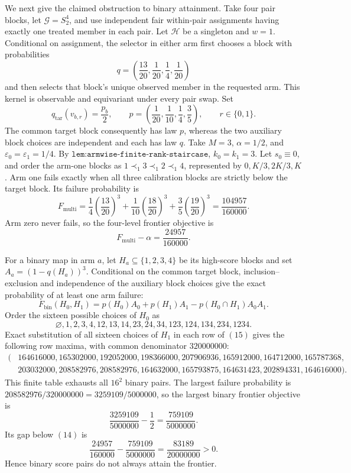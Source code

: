 We next give the claimed obstruction to binary attainment. Take four pair blocks, let \(\mathcal G=S_2^4\), and use independent fair within-pair assignments having exactly one treated member in each pair. Let \(\mathcal H\) be a singleton and \(w=1\). Conditional on assignment, the selector in either arm first chooses a block with probabilities
\[
q=\left(\frac{13}{20},\frac1{20},\frac14,\frac1{20}\right)
\tag{11}
\]
and then selects that block's unique observed member in the requested arm. This kernel is observable and equivariant under every pair swap. Set
\[
q_{\mathrm{tar}}(v_{b,r})=\frac{p_b}{2},
\qquad
p=\left(\frac1{20},\frac1{10},\frac14,\frac35\right),
\qquad r\in\{0,1\}.
\tag{12}
\]
The common target block consequently has law \(p\), whereas the two auxiliary block choices are independent and each has law \(q\). Take \(M=3\), \(\alpha=1/2\), and \(\varepsilon_0=\varepsilon_1=1/4\). By \(\texttt{lem:armwise-finite-rank-staircase}\), \(k_0=k_1=3\). Let \(s_0\equiv0\), and order the arm-one blocks as \(1\prec_1 3\prec_1 2\prec_1 4\), represented by \(0,K/3,2K/3,K\). Arm one fails exactly when all three calibration blocks are strictly below the target block. Its failure probability is
\[
F_{\mathrm{multi}}
=\frac14\left(\frac{13}{20}\right)^3
+\frac1{10}\left(\frac{18}{20}\right)^3
+\frac35\left(\frac{19}{20}\right)^3
=\frac{104957}{160000}.
\tag{13}
\]
Arm zero never fails, so the four-level frontier objective is
\[
F_{\mathrm{multi}}-\alpha=\frac{24957}{160000}.
\tag{14}
\]

For a binary map in arm \(a\), let \(H_a\subseteq\{1,2,3,4\}\) be its high-score blocks and set \(A_a=(1-q(H_a))^3\). Conditional on the common target block, inclusion--exclusion and independence of the auxiliary block choices give the exact probability of at least one arm failure:
\[
F_{\mathrm{bin}}(H_0,H_1)
=p(H_0)A_0+p(H_1)A_1-p(H_0\cap H_1)A_0A_1.
\tag{15}
\]
Order the sixteen possible choices of \(H_0\) as
\[
\varnothing,1,2,3,4,12,13,14,23,24,34,123,124,134,234,1234.
\]
Exact substitution of all sixteen choices of \(H_1\) in each row of \((15)\) gives the following row maxima, with common denominator \(320000000\):
\[
\begin{split}
(&164616000,165302000,192052000,198366000,207906936,165912000,164712000,165787368,\\
&203032000,208582976,208582976,164632000,165793875,164631423,202894331,164616000).
\end{split}
\tag{16}
\]
This finite table exhausts all \(16^2\) binary pairs. The largest failure probability is \(208582976/320000000=3259109/5000000\), so the largest binary frontier objective is
\[
\frac{3259109}{5000000}-\frac12=\frac{759109}{5000000}.
\]
Its gap below \((14)\) is
\[
\frac{24957}{160000}-\frac{759109}{5000000}
=\frac{83189}{20000000}>0.
\tag{17}
\]
Hence binary score pairs do not always attain the frontier.

